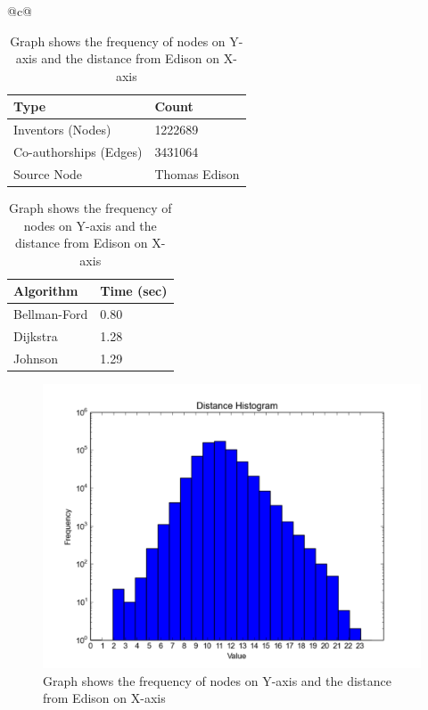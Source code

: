 \begin{table}[h] 
	\scriptsize
  \begin{tabular}{@{}c@{}} 
  \begin{minipage}{0.4\linewidth}
		\begin{center}
	  		\begin{tabular}{| l | l |}
				\hline
				
				{Type} & {Count} \\
				\hline
				\hline
				Inventors (Nodes) & 1222689 \\
				Co-authorships (Edges) & 3431064 \\
				Source Node & Thomas Edison\\
				\hline
			\end{tabular}		
			\caption {\scriptsize Details of the co-authorship graph}
			\label{tab:model}

			\vspace{0.85cm}

			\begin{tabular}{| l | l |}
				\hline
				{Algorithm} & {Time (sec)} \\
				\hline
				\hline
				Bellman-Ford & 0.80 \\
				Dijkstra & 1.28 \\
				Johnson & 1.29 \\
				\hline
			\end{tabular}
			\caption {\scriptsize Performance of the three shortest path algorithms}
			\label{tab:algos}
		\end{center}

  \end{minipage}
  \hspace{0.05\linewidth}
  \begin{minipage}{0.45\linewidth}
      \begin{figure}[H]
          \includegraphics[scale=0.425]{../figures/distance.pdf}
          \caption{\scriptsize Graph shows the frequency of nodes on Y-axis and the distance from
		Edison on X-axis }
	  \label{fig:distance}
      \end{figure}
  \end{minipage}
  \end{tabular}
\end{table}

